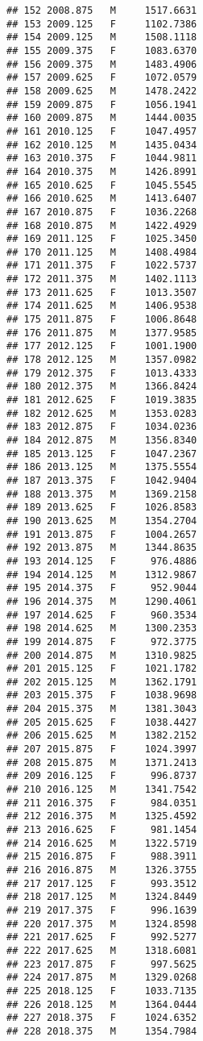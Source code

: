\documentclass[]{article}
\begin{document}
\begin{verbatim}
## 152 2008.875   M     1517.6631
## 153 2009.125   F     1102.7386
## 154 2009.125   M     1508.1118
## 155 2009.375   F     1083.6370
## 156 2009.375   M     1483.4906
## 157 2009.625   F     1072.0579
## 158 2009.625   M     1478.2422
## 159 2009.875   F     1056.1941
## 160 2009.875   M     1444.0035
## 161 2010.125   F     1047.4957
## 162 2010.125   M     1435.0434
## 163 2010.375   F     1044.9811
## 164 2010.375   M     1426.8991
## 165 2010.625   F     1045.5545
## 166 2010.625   M     1413.6407
## 167 2010.875   F     1036.2268
## 168 2010.875   M     1422.4929
## 169 2011.125   F     1025.3450
## 170 2011.125   M     1408.4984
## 171 2011.375   F     1022.5737
## 172 2011.375   M     1402.1113
## 173 2011.625   F     1013.3507
## 174 2011.625   M     1406.9538
## 175 2011.875   F     1006.8648
## 176 2011.875   M     1377.9585
## 177 2012.125   F     1001.1900
## 178 2012.125   M     1357.0982
## 179 2012.375   F     1013.4333
## 180 2012.375   M     1366.8424
## 181 2012.625   F     1019.3835
## 182 2012.625   M     1353.0283
## 183 2012.875   F     1034.0236
## 184 2012.875   M     1356.8340
## 185 2013.125   F     1047.2367
## 186 2013.125   M     1375.5554
## 187 2013.375   F     1042.9404
## 188 2013.375   M     1369.2158
## 189 2013.625   F     1026.8583
## 190 2013.625   M     1354.2704
## 191 2013.875   F     1004.2657
## 192 2013.875   M     1344.8635
## 193 2014.125   F      976.4886
## 194 2014.125   M     1312.9867
## 195 2014.375   F      952.9044
## 196 2014.375   M     1290.4061
## 197 2014.625   F      960.3534
## 198 2014.625   M     1300.2353
## 199 2014.875   F      972.3775
## 200 2014.875   M     1310.9825
## 201 2015.125   F     1021.1782
## 202 2015.125   M     1362.1791
## 203 2015.375   F     1038.9698
## 204 2015.375   M     1381.3043
## 205 2015.625   F     1038.4427
## 206 2015.625   M     1382.2152
## 207 2015.875   F     1024.3997
## 208 2015.875   M     1371.2413
## 209 2016.125   F      996.8737
## 210 2016.125   M     1341.7542
## 211 2016.375   F      984.0351
## 212 2016.375   M     1325.4592
## 213 2016.625   F      981.1454
## 214 2016.625   M     1322.5719
## 215 2016.875   F      988.3911
## 216 2016.875   M     1326.3755
## 217 2017.125   F      993.3512
## 218 2017.125   M     1324.8449
## 219 2017.375   F      996.1639
## 220 2017.375   M     1324.8598
## 221 2017.625   F      992.5277
## 222 2017.625   M     1318.6081
## 223 2017.875   F      997.5625
## 224 2017.875   M     1329.0268
## 225 2018.125   F     1033.7135
## 226 2018.125   M     1364.0444
## 227 2018.375   F     1024.6352
## 228 2018.375   M     1354.7984
\end{verbatim}
\end{document}
